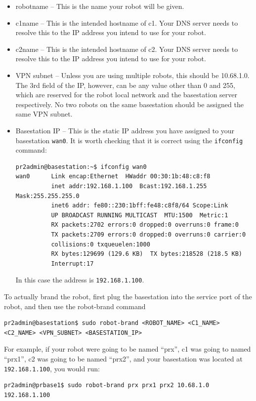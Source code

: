 \begin{itemize}
\item robotname -- This is the name your robot will be given.
\item c1name -- This is the intended hostname of c1.  Your DNS server needs to resolve this to the IP address you intend to use for your robot.
\item c2name -- This is the intended hostname of c2.  Your DNS server needs to resolve this to the IP address you intend to use for your robot.
\item VPN subnet -- Unless you are using multiple robots, this should be 10.68.1.0.  The 3rd field of the IP, however, can be any value other than 0 and 255, which are reserved for the robot local network and the basestation server respectively.  No two robots on the same basestation should be assigned the same VPN subnet.
\item Basestation IP -- This is the static IP address you have assigned to your basestation \texttt{wan0}.
  It is worth checking that it is correct using the \texttt{ifconfig} command:
\begin{verbatim}
pr2admin@basestation:~$ ifconfig wan0
wan0      Link encap:Ethernet  HWaddr 00:30:1b:48:c8:f8  
          inet addr:192.168.1.100  Bcast:192.168.1.255  Mask:255.255.255.0
          inet6 addr: fe80::230:1bff:fe48:c8f8/64 Scope:Link
          UP BROADCAST RUNNING MULTICAST  MTU:1500  Metric:1
          RX packets:2702 errors:0 dropped:0 overruns:0 frame:0
          TX packets:2709 errors:0 dropped:0 overruns:0 carrier:0
          collisions:0 txqueuelen:1000 
          RX bytes:129699 (129.6 KB)  TX bytes:218528 (218.5 KB)
          Interrupt:17 
\end{verbatim}
In this case the address is \texttt{192.168.1.100}.
\end{itemize}

To actually brand the robot, first plug the basestation into the
service port of the robot, and then use the robot-brand command

\begin{verbatim}
pr2admin@basestation$ sudo robot-brand <ROBOT_NAME> <C1_NAME> <C2_NAME> <VPN_SUBNET> <BASESTATION_IP>
\end{verbatim}

For example, if your robot were going to be named ``prx'', c1 was
going to named ``prx1'', c2 was going to be named ``prx2'', and your
basestation was located at \texttt{192.168.1.100}, you would run:

\begin{verbatim}
pr2admin@prbase1$ sudo robot-brand prx prx1 prx2 10.68.1.0 192.168.1.100
\end{verbatim}

